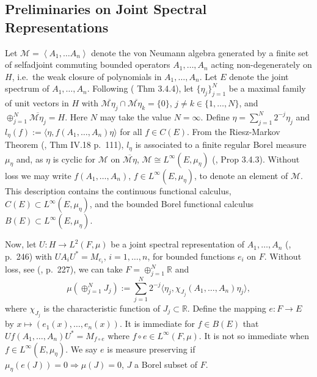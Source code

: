 \documentclass[final,1p]{elsarticle}
\numberwithin{equation}{section}
\theoremstyle{plain}
\theoremstyle{definition}
\begin{document}
\subsection{Preliminaries on Joint Spectral Representations} \label{sec:prelim_sp}

\medskip Let $\mathcal{M}=\left< A_1,\ldots A_n \right>$ denote the von Neumann algebra generated by a finite set of selfadjoint commuting bounded operators $A_1,\ldots,A_n$ acting non-degenerately on $H$, i.e.~the weak closure of polynomials in $A_1, \ldots, A_n$.  Let $E$ denote the joint spectrum of $A_1,\ldots,A_n$.  Following (\cite{Ped} Thm 3.4.4),
let $\{ \eta_j \}_{j=1}^N$ be a maximal family of unit vectors in $H$ with $\overline{\mathcal{M}\eta_j} \cap \overline{\mathcal{M}\eta_k} = \{ 0 \}$, $j \not= k \in \{1,\ldots,N\}$, and $\oplus_{j=1}^N \overline{\mathcal{M} \eta_j} = H$.  Here $N$ may take the value $N = \infty$.  Define $\eta = \sum_{j=1}^N 2^{-j} \eta_j$ and $l_\eta(f) := {\ensuremath{\langle {\eta} , {f(A_1,\ldots,A_n)\eta} \rangle}}$ for all $f \in C(E)$.  From the Riesz-Markov Theorem (\cite{RS}, Thm IV.18 p.~111), $l_\eta$ is associated to a finite regular Borel measure $\mu_\eta$ and, as $\eta$ is cyclic for $\mathcal{M}$ on $\overline{\mathcal{M} \eta}$, $\mathcal{M} \cong L^\infty(E,\mu_\eta)$ (\cite{Ped}, Prop 3.4.3).
Without loss we may write $f(A_1,\ldots,A_n)$, $f \in L^\infty(E,\mu_\eta)$,
to denote an element of $\mathcal{M}$.  This description contains the continuous functional
calculus, $C(E) \subset L^\infty(E,\mu_\eta)$, and the bounded Borel functional
calculus $B(E) \subset L^\infty(E,\mu_\eta)$.

Now, let $U : H \to L^2(F,\mu)$ be a joint spectral representation
of $A_1,\ldots,A_n$ (\cite{RS}, p.~246) with $UA_iU^* = M_{e_i}$, $i =1,\ldots,n$,  for bounded
functions $e_i$ on $F$. Without loss, see (\cite{RS}, p.~227), we can take $F = \oplus_{j=1}^N {\ensuremath{\mathbb{R}}}$ and
$$\mu(\oplus_{j=1}^N J_j) := \sum_{j=1}^N 2^{-j} {\ensuremath{\langle {\eta_j} , {\chi_{J_j}(A_1,\ldots,A_n) \eta_j} \rangle}},
$$
where $\chi_{J_j}$ is the characteristic function of $J_j \subset {\ensuremath{\mathbb{R}}}$.
Define the mapping $e : F \to E$ by $x \mapsto (e_1(x),\ldots,e_n(x))$.  
It is immediate for $f \in B(E)$ that $Uf(A_1,\ldots,A_n)U^*  = M_{f \circ e}$ where
$f \circ e \in L^\infty(F,\mu)$.  It is not so immediate when $f \in L^\infty(E,\mu_\eta)$.  
We say $e$ is measure preserving if $\mu_\eta(e(J)) = 0 \Rightarrow \mu(J)=0$, $J$ a Borel subset of $F$.
\end{document}

